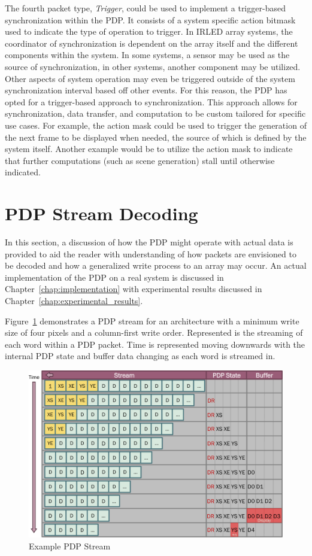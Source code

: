     The fourth packet type, {\it Trigger}, could be used to implement a trigger-based synchronization within the PDP. It consists of a system specific action bitmask used to indicate the type of operation to trigger. In IRLED array systems, the coordinator of synchronization is dependent on the array itself and the different components within the system. In some systems, a sensor may be used as the source of synchronization, in other systems, another component may be utilized. Other aspects of system operation may even be triggered outside of the system synchronization interval based off other events. For this reason, the PDP has opted for a trigger-based approach to synchronization. This approach allows for synchronization, data transfer, and computation to be custom tailored for specific use cases. For example, the action mask could be used to trigger the generation of the next frame to be displayed when needed, the source of which is defined by the system itself. Another example would be to utilize the action mask to indicate that further computations (such as scene generation) stall until otherwise indicated.

\section{PDP Stream Decoding}
    \label{sec:pdp_stream_decoding}
    In this section, a discussion of how the PDP might operate with actual data is provided to aid the reader with understanding of how packets are envisioned to be decoded and how a generalized write process to an array may occur. An actual implementation of the PDP on a real system is discussed in Chapter~\ref{chap:implementation} with experimental results discussed in Chapter~\ref{chap:experimental_results}.

    Figure~\ref{fig:pdp_stream} demonstrates a PDP stream for an architecture with a minimum write size of four pixels and a column-first write order. Represented is the streaming of each word within a PDP packet. Time is represented moving downwards with the internal PDP state and buffer data changing as each word is streamed in.

    \begin{figure}
        \centering
        \includegraphics[width=1.0\textwidth]{fig/pdp_stream.pdf}
        \caption{Example PDP Stream}
        \label{fig:pdp_stream}
    \end{figure}

